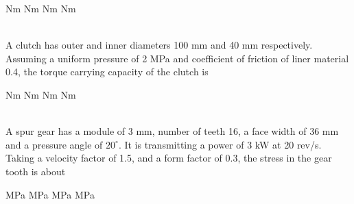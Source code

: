 \documentclass[addpoints,11pt]{exam}
\begin{document}
\begin{questions}
        \begin{oneparchoices}
             Nm
             Nm
             Nm
             Nm
        \end{oneparchoices}\\

        \question A clutch has outer and inner diameters 100 mm and 40 mm respectively. Assuming a uniform pressure of 2 MPa and coefficient of friction of liner material 0.4, the torque carrying capacity of the clutch is\\

        \begin{oneparchoices}
             Nm
             Nm
             Nm
             Nm
        \end{oneparchoices}\\

        \question A spur gear has a module of 3 mm, number of teeth 16, a face width of 36 mm and a pressure angle of $20^\circ$. It is transmitting a power of 3 kW at 20 rev/s. Taking a velocity factor of 1.5, and a form factor of 0.3, the stress in the gear tooth is about\\

        \begin{oneparchoices}
             MPa
             MPa
             MPa
             MPa
        \end{oneparchoices}\\


\end{questions}
\end{document}
